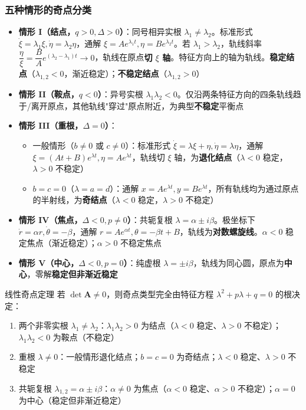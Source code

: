 \subsubsection{五种情形的奇点分类}

\begin{itemize}
    \item \textbf{情形 I（结点，$q > 0, \Delta > 0$）}：同号相异实根 $\lambda_1 \neq \lambda_2$。标准形式 $\dot{\xi} = \lambda_1\xi, \dot{\eta} = \lambda_2\eta$，通解 $\xi = Ae^{\lambda_1t}, \eta = Be^{\lambda_2t}$。若 $\lambda_1 > \lambda_2$，轨线斜率 $\dfrac{\eta}{\xi} = \dfrac{B}{A}e^{(\lambda_2-\lambda_1)t} \to 0$，轨线在原点\textbf{切 $\xi$ 轴}。特征方向上的轴为轨线。\textbf{稳定结点}（$\lambda_{1,2} < 0$，渐近稳定）；\textbf{不稳定结点}（$\lambda_{1,2} > 0$）
    \item \textbf{情形 II（鞍点，$q < 0$）}：异号实根 $\lambda_1\lambda_2 < 0$。仅沿两条特征方向的四条轨线趋于/离开原点，其他轨线"穿过"原点附近，为典型\textbf{不稳定}平衡点
    \item \textbf{情形 III（重根，$\Delta = 0$）}：
    \begin{itemize}
        \item 一般情形（$b \neq 0$ 或 $c \neq 0$）：标准形式 $\dot{\xi} = \lambda\xi + \eta, \dot{\eta} = \lambda\eta$，通解 $\xi = (At+B)e^{\lambda t}, \eta = Ae^{\lambda t}$，轨线切 $\xi$ 轴，为\textbf{退化结点}（$\lambda < 0$ 稳定，$\lambda > 0$ 不稳定）
        \item $b = c = 0$（$\lambda = a = d$）：通解 $x = Ae^{\lambda t}, y = Be^{\lambda t}$，所有轨线均为通过原点的半射线，为\textbf{奇结点}（$\lambda < 0$ 稳定，$\lambda > 0$ 不稳定）
    \end{itemize}
    \item \textbf{情形 IV（焦点，$\Delta < 0, p \neq 0$）}：共轭复根 $\lambda = \alpha \pm i\beta$。极坐标下 $\dot{r} = \alpha r, \dot{\theta} = -\beta$，通解 $r = Ae^{\alpha t}, \theta = -\beta t + B$，轨线为\textbf{对数螺旋线}。$\alpha < 0$ 稳定焦点（渐近稳定）；$\alpha > 0$ 不稳定焦点
    \item \textbf{情形 V（中心，$\Delta < 0, p = 0$）}：纯虚根 $\lambda = \pm i\beta$，轨线为同心圆，原点为\textbf{中心}，零解\textbf{稳定但非渐近稳定}
\end{itemize}

\begin{myTheorem}{线性奇点定理}
若 $\det\mathbf{A} \neq 0$，则奇点类型完全由特征方程 $\lambda^2 + p\lambda + q = 0$ 的根决定：
\begin{enumerate}
    \item 两个非零实根 $\lambda_1 \neq \lambda_2$：$\lambda_1\lambda_2 > 0$ 为结点（$\lambda < 0$ 稳定、$\lambda > 0$ 不稳定）；$\lambda_1\lambda_2 < 0$ 为鞍点（不稳定）
    \item 重根 $\lambda \neq 0$：一般情形退化结点；$b = c = 0$ 为奇结点；$\lambda < 0$ 稳定、$\lambda > 0$ 不稳定
    \item 共轭复根 $\lambda_{1,2} = \alpha \pm i\beta$：$\alpha \neq 0$ 为焦点（$\alpha < 0$ 稳定、$\alpha > 0$ 不稳定）；$\alpha = 0$ 为中心（稳定但非渐近稳定）
\end{enumerate}
\end{myTheorem}

